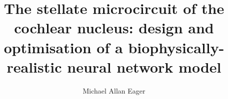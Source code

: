 
\title{%
The stellate microcircuit of the cochlear nucleus: design and optimisation of a biophysically-realistic neural network model}

\author{Michael Allan Eager}





